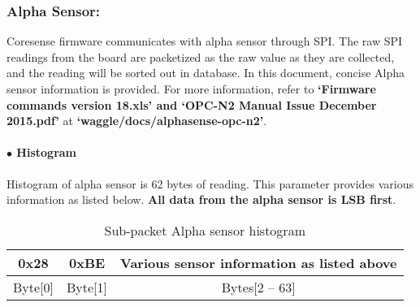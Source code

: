 
\subsubsection{Alpha Sensor:}
Coresense firmware communicates with alpha sensor through SPI.
The raw SPI readings from the board are packetized as the raw value as they are collected, and the reading will be sorted out in database.
In this document, concise Alpha sensor information is provided. For more information, refer to \textbf{`Firmware commands version 18.xls' and `OPC-N2 Manual Issue December 2015.pdf'} at \textbf{`waggle/docs/alphasense-opc-n2'}.

\paragraph{$\bullet$ Histogram}
Histogram of alpha sensor is 62 bytes of reading. This parameter provides various information as listed below. \textbf{All data from the alpha sensor is LSB first}.

\begin{table}[h!]
    \centering
    \caption{Sub-packet Alpha sensor histogram}
    \begin{tabular}{|c|c|c|}
        \hline
        \rowcolor{black!8}
        \textbf{0x28} & \textbf{0xBE} & \textbf{Various sensor information as listed above}\\
        \hline
        Byte[0] & Byte[1] & Bytes[2 -- 63] \\ \hline
    \end{tabular}
\end{table}


